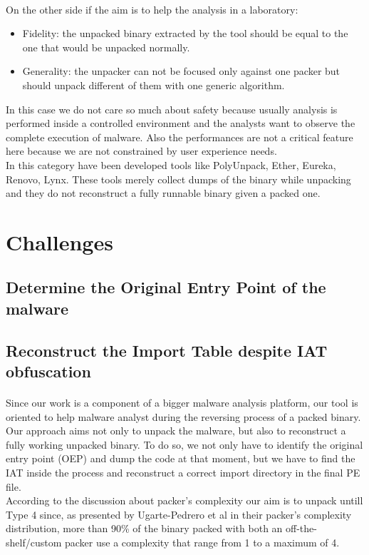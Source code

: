 \paragraph{}
On the other side if the aim is to help the analysis in a laboratory:
\begin{itemize}
\item Fidelity: the unpacked binary extracted by the tool should be equal to the one that would be unpacked normally. 
\item Generality: the unpacker can not be focused only against one packer but should unpack different of them with one generic algorithm.
\end{itemize}
In this case we do not care so much about safety because usually analysis is performed inside a controlled environment and the analysts want to observe the complete execution of malware. Also the performances are not a critical feature here because we are not constrained by user experience needs.\\
In this category have been developed tools like PolyUnpack, Ether, Eureka, Renovo, Lynx.
These tools merely collect dumps of the binary while unpacking and they do not reconstruct a fully runnable binary given a packed one.


\section{Challenges}
\subsection{Determine the Original Entry Point of the malware}

\subsection{Reconstruct the Import Table despite IAT obfuscation}

\paragraph{}
Since our work is a component of a bigger malware analysis platform\cite{jackdaw}, our tool is oriented to help malware analyst during the reversing process of a packed binary. 
Our approach aims not only to unpack the malware, but also to reconstruct a fully working unpacked binary. To do so, we not only have to identify the original entry point (OEP) and dump the code at that moment, but we have to find the IAT inside the process and reconstruct a correct import directory in the final PE file.\\
According to the discussion about packer's complexity our aim is to unpack untill Type 4 since, as presented by Ugarte-Pedrero et al\cite{sokpacker} in their packer's complexity distribution, more than 90\% of the binary packed with both an off-the-shelf/custom packer use a complexity that range from 1 to a maximum of 4.
